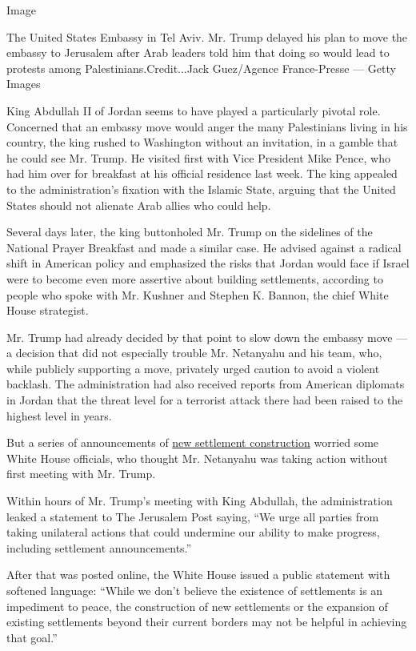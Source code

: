 Image

The United States Embassy in Tel Aviv. Mr. Trump delayed his plan to
move the embassy to Jerusalem after Arab leaders told him that doing so
would lead to protests among Palestinians.Credit...Jack Guez/Agence
France-Presse --- Getty Images

King Abdullah II of Jordan seems to have played a particularly pivotal
role. Concerned that an embassy move would anger the many Palestinians
living in his country, the king rushed to Washington without an
invitation, in a gamble that he could see Mr. Trump. He visited first
with Vice President Mike Pence, who had him over for breakfast at his
official residence last week. The king appealed to the administration's
fixation with the Islamic State, arguing that the United States should
not alienate Arab allies who could help.

Several days later, the king buttonholed Mr. Trump on the sidelines of
the National Prayer Breakfast and made a similar case. He advised
against a radical shift in American policy and emphasized the risks that
Jordan would face if Israel were to become even more assertive about
building settlements, according to people who spoke with Mr. Kushner and
Stephen K. Bannon, the chief White House strategist.

Mr. Trump had already decided by that point to slow down the embassy
move --- a decision that did not especially trouble Mr. Netanyahu and
his team, who, while publicly supporting a move, privately urged caution
to avoid a violent backlash. The administration had also received
reports from American diplomats in Jordan that the threat level for a
terrorist attack there had been raised to the highest level in years.

But a series of announcements of
\href{https://www.nytimes.com/2017/02/01/world/middleeast/israel-3000-homes-west-bank.html}{new
settlement construction} worried some White House officials, who thought
Mr. Netanyahu was taking action without first meeting with Mr. Trump.

Within hours of Mr. Trump's meeting with King Abdullah, the
administration leaked a statement to The Jerusalem Post saying, ``We
urge all parties from taking unilateral actions that could undermine our
ability to make progress, including settlement announcements.''

After that was posted online, the White House issued a public statement
with softened language: ``While we don't believe the existence of
settlements is an impediment to peace, the construction of new
settlements or the expansion of existing settlements beyond their
current borders may not be helpful in achieving that goal.''

